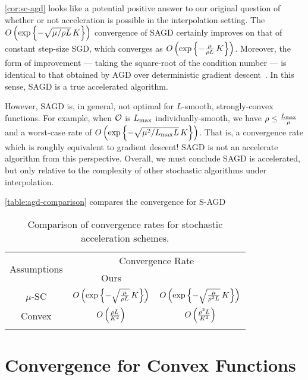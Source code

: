 \autoref{cor:sc-agd} looks like a potential positive answer to our original question of whether or not acceleration is possible in the interpolation setting.
The \( O\rbr{ \exp \cbr{- \sqrt{\mu / \rho L} \, K}} \) convergence of SAGD certainly improves on that of constant step-size SGD, which converges as \( O\rbr{ \exp \cbr{- \frac{\mu}{\rho L} \, K}} \).
Moreover, the form of improvement --- taking the square-root of the condition number --- is identical to that obtained by AGD over deterministic gradient descent~\citep{nesterov2004lectures}.
In this sense, SAGD is a true accelerated algorithm.

However, SAGD is, in general, not optimal for \( L \)-smooth, strongly-convex functions. 
For example, when \( \oracle{} \) is \( \Lmax \) individually-smooth, we have \( \rho \leq \frac{\Lmax}{\mu} \) and a worst-case rate of \( O\rbr{ \exp \cbr{- \sqrt{\mu^2 / \Lmax L} \, K}}\).
That is, a convergence rate which is roughly equivalent to gradient descent!
SAGD is not an accelerate algorithm from this perspective.
Overall, we must conclude SAGD is accelerated, but only relative to the complexity of other stochastic algorithms under interpolation.

\autoref{table:agd-comparison} compares the convergence for S-AGD 


\begin{table}[t]
    \centering
    \begin{tabular}{c c c  }\toprule
        \multirow{2}{*}{Assumptions} & \multicolumn{2}{c}{Convergence Rate}\\%
        \cmidrule(lr){2-3} 
                 & \multicolumn{1}{c}{Ours} & \multicolumn{1}{c}{\citet{vaswani2019painless}}\\ \midrule
        \( \mu \)-SC & \( O\rbr{\exp\cbr{- \sqrt{\frac{\mu}{\rho L}} \, K}} \)%
                     & \( O\rbr{\exp\cbr{- \sqrt{\frac{\mu}{\rho^2 L}} \, K}} \) \\ \addlinespace
        Convex       & \( O\rbr{\frac{\rho L}{K^2}} \)%
                 & \( O\rbr{\frac{\rho^2 L}{K^2}} \)\\ \addlinespace 
        \end{tabular}
        \caption{Comparison of convergence rates for stochastic acceleration schemes.}%
    \label{table:agd-comparison}
\end{table}

\section{Convergence for Convex Functions}\label{sec:agd-convex}


